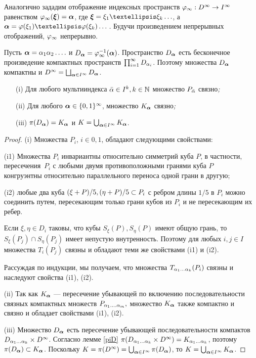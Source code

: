 Аналогично зададим отображение индексных пространств $\varphi_\infty: D^\infty\to I^\infty$ равенством $\varphi_\infty({\bm{\xi}})={\bm{\alpha}}$, где  $\bmx=\xi_1…\xi_k\ldots$, а  $\bma=\fy(\xi_1)…\fy(\xi_k)\ldots$\,. 
Будучи произведением непрерывных отображений, $\varphi_\infty$ непрерывно.

Пусть ${\bm{\alpha}}=\alpha_1\alpha_2\ldots.$ и $D_{\bm{\alpha}}=\varphi_\infty^{-1}({\bm{\alpha}})$. 
Пространство $D_{\bm{\alpha}}$ есть бесконечное произведение компактных пространств $\prod_{i=1}^\infty D_{\alpha_i}$.
Поэтому множества $D_{\bm{\alpha}}$ компактны и $D^\infty=\bigsqcup_{{\bm{\alpha}}\in I^\infty}D_{\bm{\alpha}}$.
\begin{lemma}\label{svyaz}
\begin{itemize}[nolistserp]
\item[{\rm (i)}]  Для любого мультииндекса $\bar{\alpha}\in I^k, k\in\mathbb{N}$ множество   $P_{\bar{\alpha}}$ связно\emph{;}

\item[{\rm (ii)}] Для любого ${\bm{\alpha}}\in\{0,1\}^\infty$, множество $K_{\bm{\alpha}}$ связно\emph{;}
\item[{\rm (iii)}] $\pi(D_{\bm{\alpha}})=K_{\bm{\alpha}}$ и $K=\bigcup_{{\bm{\alpha}}\in I^\infty}K_{\bm{\alpha}}$.
\end{itemize}
\end{lemma}

\begin{proof}
(i) Множества $P_i$,  $i\in{0,1}$, обладают следующими  свойствами:\smallskip

(i1)  Множества $P_i$ инвариантны относительно симметрий куба $P$, в частности, пересечения~$P_i$ с любыми двумя противоположными гранями куба $P$ конгруэнтны относительно параллельного переноса одной грани в другую;\smallskip

(i2) любые два куба $(\xi+P)/5, (\eta+P)/5 \subset P_i$ с ребром длины $1/5$ в $P_i$ можно соединить путем, пересекающим только грани кубов из $P_i$ и не пересекающим их ребер.\smallskip

Если $\xi,\eta\in D_i$ таковы, что кубы $S_\xi(P), S_\eta(P)$ имеют общую грань, то $S_\xi(P_j)\cap S_\eta(P_j)$ имеет непустую внутренность.  
Поэтому для любых $i,j\in I$ множества $T_i(P_j)$ связны  и обладают теми же свойствами (i1) и (i2).

Рассуждая по индукции, мы получаем, что множества $T_{\alpha_1\ldots\alpha_k} (P_i)$ связны и наследуют  свойства (i1), (i2).\smallskip

(ii) Так как $K_{\bm{\alpha}}$ --- пересечение убывающей по включению последовательности связных компактных множеств $P_{\alpha_1\ldots.\alpha_m},$  множество $K_{\bm{\alpha}}$ также компактно и связно и обладает свойствами (i1), (i2).\smallskip

(iii) Множество $D_{\bm{\alpha}}$ есть пересечение убывающей последовательности компактов
$D_{\alpha_1\ldots\alpha_k}\times D^\infty$. Согласно лемме  \ref{piD} $\pi(D_{\alpha_1\ldots\alpha_k}\times D^\infty)=K_{\alpha_1\ldots\alpha_k} $,  поэтому $\pi(D_{\bm{\alpha}})\subset K_{\bm{\alpha}}$. Поскольку $K=\pi(D^\infty)=\bigcup_{{\bm{\alpha}}\in I^\infty}\pi(D_{\bm{\alpha}})$, то $K=\bigcup_{{\bm{\alpha}}\in I^\infty}K_{\bm{\alpha}}$.
\end{proof}


